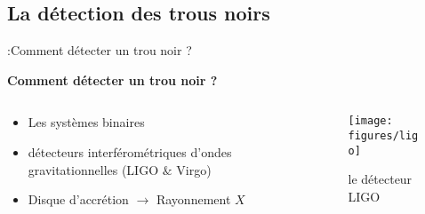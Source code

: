 \subsection{La détection des trous noirs}
\begin{frame}{\underline{\secname} :Comment détecter un trou noir ?}

\begin{center}
	\textbf{Comment détecter un trou noir ?}
\end{center}

 \begin{columns}

	\begin{column}{0.6\linewidth}	
	\begin{itemize}  \setlength\itemsep{0.5em}
		\item  Les systèmes binaires
%
%
%
%


	\item 		détecteurs interférométriques d’ondes gravitationnelles 	(LIGO $\&$ Virgo)
	\item 			Disque d’accrétion $\rightarrow$ Rayonnement $X$

	\end{itemize}	
		
	\end{column}
	\begin{column}{0.4\linewidth}
		
		\begin{block}
	
	
\begin{center}

		      \begin{figure}
		      	\texttt{[image: figures/ligo]}
		   	\caption{le détecteur LIGO}

		
	\end{figure}
\end{center}
	
	
			
		\end{block}	
	\end{column}
\end{columns}
 
\end{frame}